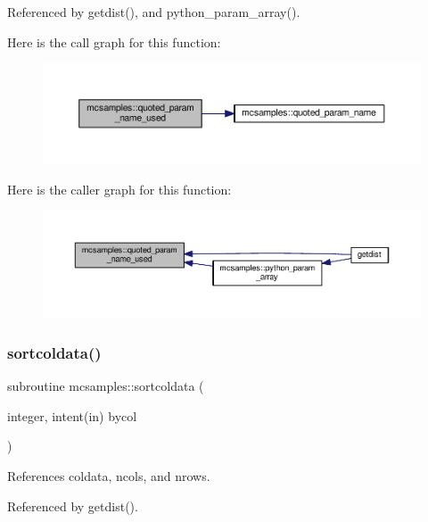 Referenced by getdist(), and python\+\_\+param\+\_\+array().

Here is the call graph for this function\+:
\nopagebreak
\begin{figure}[H]
\begin{center}
\leavevmode
\includegraphics[width=350pt]{namespacemcsamples_aaed4d229224d51b97154b233f072fae9_cgraph}
\end{center}
\end{figure}
Here is the caller graph for this function\+:
\nopagebreak
\begin{figure}[H]
\begin{center}
\leavevmode
\includegraphics[width=350pt]{namespacemcsamples_aaed4d229224d51b97154b233f072fae9_icgraph}
\end{center}
\end{figure}
\mbox{\label{namespacemcsamples_af00e1e65ba0440ba9f05136bb9219f55}} 
\subsubsection{\texorpdfstring{sortcoldata()}{sortcoldata()}}
{\footnotesize\ttfamily subroutine mcsamples\+::sortcoldata (\begin{DoxyParamCaption}\item[{integer, intent(in)}]{bycol }\end{DoxyParamCaption})}



References coldata, ncols, and nrows.



Referenced by getdist().

